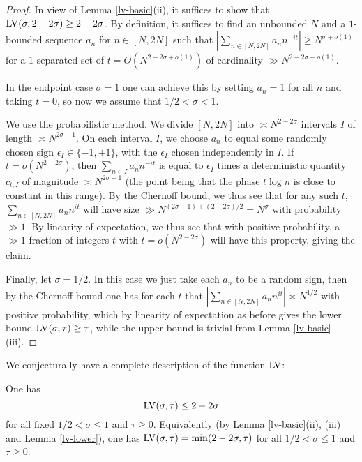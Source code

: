 \begin{proof} In view of Lemma \ref{lv-basic}(ii), it suffices to show that $\mathrm{LV}(\sigma, 2-2\sigma) \geq 2-2\sigma$.  By definition, it suffices to find an unbounded $N$ and a $1$-bounded sequence $a_n$ for $n \in [N,2N]$ such that $|\sum_{n \in [N,2N]} a_n n^{-it}| \geq N^{\sigma+o(1)}$ for a $1$-separated set of $t = O(N^{2-2\sigma+o(1)})$ of cardinality $\gg N^{2-2\sigma-o(1)}$.

In the endpoint case $\sigma = 1$ one can achieve this by setting $a_n=1$ for all $n$ and taking $t=0$, so now we assume that $1/2 < \sigma<1$.

We use the probabilistic method.  We divide $[N,2N]$ into $\asymp N^{2-2\sigma}$ intervals $I$ of length $\asymp N^{2\sigma-1}$.  On each interval $I$, we choose $a_n$ to equal some randomly chosen sign $\epsilon_I \in \{-1,+1\}$, with the $\epsilon_I$ chosen independently in $I$.  If $t = o(N^{2-2\sigma})$, then $\sum_{n \in I} a_n n^{-it}$ is equal to $\epsilon_I$ times a deterministic quantity $c_{t,I}$ of magnitude $\asymp N^{2\sigma-1}$ (the point being that the phase $t \log n$ is close to constant in this range).  By the Chernoff bound, we thus see that for any such $t$, $\sum_{n \in [N,2N]} a_n n^{it}$ will have size $\gg N^{(2\sigma-1) + (2-2\sigma)/2} = N^\sigma$ with probability $\gg 1$. By linearity of expectation, we thus see that with positive probability, a $\gg 1$ fraction of integers $t$ with $t = o(N^{2-2\sigma})$ will have this property, giving the claim.

Finally, let $\sigma=1/2$.  In this case we just take each $a_n$ to be a random sign, then by the Chernoff bound one has for each $t$ that $|\sum_{n \in [N,2N]} a_n n^{it}| \asymp N^{1/2}$ with positive probability, which by linearity of expectation as before gives the lower bound $\mathrm{LV}(\sigma,\tau) \geq \tau$, while the upper bound is trivial from Lemma \ref{lv-basic}(iii).
\end{proof}

We conjecturally have a complete description of the function $\mathrm{LV}$:

\begin{conjecture}\label{montgomery-conj}  One has
    \begin{equation}\label{mont-conj}
        \mathrm{LV}(\sigma, \tau) \leq 2 - 2 \sigma
    \end{equation}
     for all fixed $1/2 < \sigma \leq 1$ and $\tau \geq 0$. Equivalently (by Lemma \ref{lv-basic}(ii), (iii) and Lemma \ref{lv-lower}), one has $\mathrm{LV}(\sigma, \tau) = \min(2 - 2 \sigma,\tau)$ for all $1/2 < \sigma \leq 1$ and $\tau \geq 0$.
\end{conjecture}

